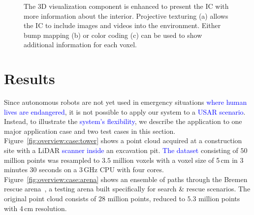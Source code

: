 \documentclass{egpubl}
\newcommand{\diff}[1]{\textcolor{blue}{#1}}
\begin{document}
\begin{figure}
{		
		\label{fig:imageenhancement:colors}
	}
	\caption{The 3D visualization component is enhanced to present the IC with more information about the interior. Projective texturing (a) allows the IC to include images and videos into the environment. Either bump mapping (b) or color coding (c) can be used to show additional information for each voxel.}
	\label{fig:imageenhancement}
\end{figure}


\section{Results} \label{sec:results}
Since autonomous robots are not yet used in emergency situations \diff{where human lives are endangered}, it is not possible to apply our system to a \diff{USAR scenario}. Instead, to illustrate the \diff{system's flexibility}, we describe the application to one major application case and two test cases in this section.\\
%
 Figure~\ref{fig:overview:case:tower} shows a point cloud acquired at a construction site with a LiDAR \diff{scanner inside} an excavation pit. \diff{The dataset} consisting of $50$ million points was resampled to $3.5$ million voxels with a voxel size of 5\,cm in 3 minutes 30 seconds on a 3\,GHz CPU with four cores.\\
%
 Figure~\ref{fig:overview:case:arena} shows an ensemble of paths through the Bremen rescue arena~\cite{varsadan08}, a testing arena built specifically for search \& rescue scenarios. The original point cloud consists of $28$ million points, reduced to $5.3$ million points with 4\,cm resolution.
\end{document}

